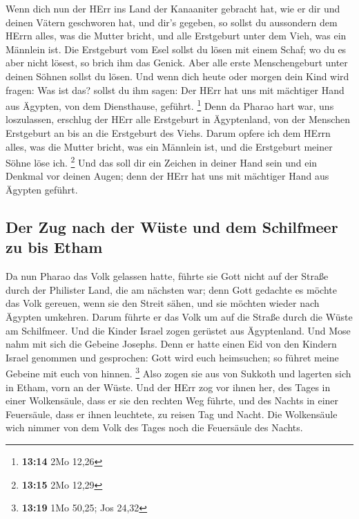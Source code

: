  Wenn dich nun der HErr ins Land der Kanaaniter gebracht
hat, wie er dir und deinen Vätern geschworen hat, und dir's gegeben,
 so sollst du aussondern dem HErrn alles, was die Mutter
bricht, und alle Erstgeburt unter dem Vieh, was ein Männlein ist.
 Die Erstgeburt vom Esel sollst du lösen mit einem Schaf;
wo du es aber nicht lösest, so brich ihm das Genick. Aber alle erste
Menschengeburt unter deinen Söhnen sollst du lösen.  Und
wenn dich heute oder morgen dein Kind wird fragen: Was ist das? sollst
du ihm sagen: Der HErr hat uns mit mächtiger Hand aus Ägypten, von dem
Diensthause, geführt. \footnote{\textbf{13:14} 2Mo 12,26}
 Denn da Pharao hart war, uns loszulassen, erschlug der
HErr alle Erstgeburt in Ägyptenland, von der Menschen Erstgeburt an bis
an die Erstgeburt des Viehs. Darum opfere ich dem HErrn alles, was die
Mutter bricht, was ein Männlein ist, und die Erstgeburt meiner Söhne
löse ich. \footnote{\textbf{13:15} 2Mo 12,29}  Und das
soll dir ein Zeichen in deiner Hand sein und ein Denkmal vor deinen
Augen; denn der HErr hat uns mit mächtiger Hand aus Ägypten geführt.

\hypertarget{der-zug-nach-der-wuxfcste-und-dem-schilfmeer-zu-bis-etham}{%
\subsection{Der Zug nach der Wüste und dem Schilfmeer zu bis
Etham}\label{der-zug-nach-der-wuxfcste-und-dem-schilfmeer-zu-bis-etham}}

 Da nun Pharao das Volk gelassen hatte, führte sie Gott
nicht auf der Straße durch der Philister Land, die am nächsten war; denn
Gott gedachte es möchte das Volk gereuen, wenn sie den Streit sähen, und
sie möchten wieder nach Ägypten umkehren.  Darum führte
er das Volk um auf die Straße durch die Wüste am Schilfmeer. Und die
Kinder Israel zogen gerüstet aus Ägyptenland.  Und Mose
nahm mit sich die Gebeine Josephs. Denn er hatte einen Eid von den
Kindern Israel genommen und gesprochen: Gott wird euch heimsuchen; so
führet meine Gebeine mit euch von hinnen. \footnote{\textbf{13:19} 1Mo
  50,25; Jos 24,32}  Also zogen sie aus von Sukkoth und
lagerten sich in Etham, vorn an der Wüste.  Und der HErr
zog vor ihnen her, des Tages in einer Wolkensäule, dass er sie den
rechten Weg führte, und des Nachts in einer Feuersäule, dass er ihnen
leuchtete, zu reisen Tag und Nacht.  Die Wolkensäule wich
nimmer von dem Volk des Tages noch die Feuersäule des Nachts.

